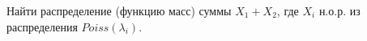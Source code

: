

\begin{problem}
    Найти распределение (функцию масс) суммы $X_1 + X_2$, где $X_i$ н.о.р. из распределения $Poiss(\lambda_i)$.
\end{problem}

